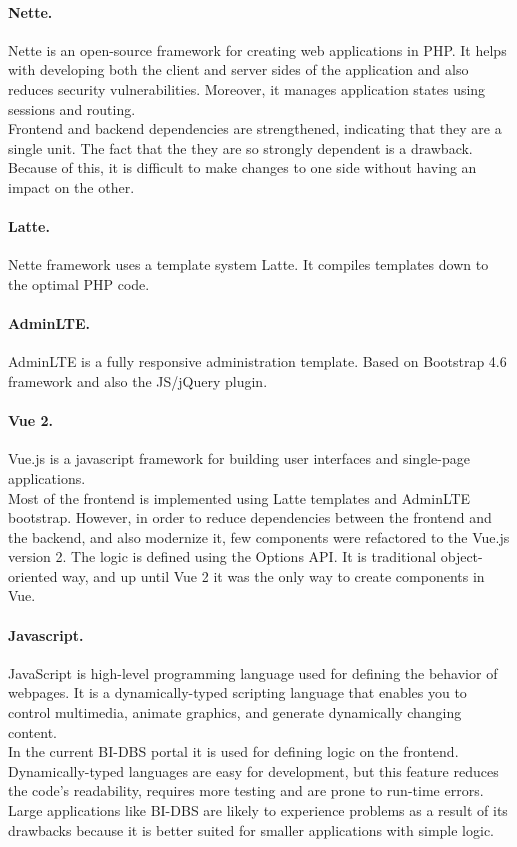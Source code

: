 \paragraph*{Nette.} Nette is an open-source framework for creating web applications in PHP. It helps with developing both the client and server sides of the application and also reduces security vulnerabilities. Moreover, it manages application states using sessions and routing.\cite{nette-doc}\\ 
Frontend and backend dependencies are strengthened, indicating that they are a single unit. The fact that the they are so strongly dependent is a drawback. Because of this, it is difficult to make changes to one side without having an impact on the other. 

\paragraph*{Latte.} Nette framework uses a template system Latte. It compiles templates down to the optimal PHP code.\cite{latte-doc}

\paragraph*{AdminLTE.} AdminLTE is a fully responsive administration template. Based on Bootstrap 4.6 framework and also the JS/jQuery plugin\cite{adminlte-doc}. 

\paragraph*{Vue 2.} Vue.js is a javascript framework for building user interfaces and single-page applications.\\
Most of the frontend is implemented using Latte templates and AdminLTE bootstrap. However, in order to reduce dependencies between the frontend and the backend, and also modernize it, few components were refactored to the Vue.js version 2. The logic is defined using the Options API. It is traditional object-oriented way, and up until Vue 2 it was the only way to create components in Vue\cite{vue2-doc}\cite{apivue-dzakelsek}.

\paragraph*{Javascript.} JavaScript is high-level programming language used for defining the behavior of webpages. It is a dynamically-typed scripting language that enables you to control multimedia, animate graphics, and generate dynamically changing content\cite{js-doc}.\\ 
In the current BI-DBS portal it is used for defining logic on the frontend. Dynamically-typed languages are easy for development, but this feature reduces the code's readability, requires more testing and are prone to run-time errors. Large applications like BI-DBS are likely to experience problems as a result of its drawbacks because it is better suited for smaller applications with simple logic.

